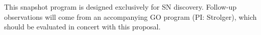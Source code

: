 This snapshot program is designed exclusively for SN
discovery. Follow-up observations will come from an accompanying GO
program (PI: Strolger), which should be evaluated in concert with this
proposal.

